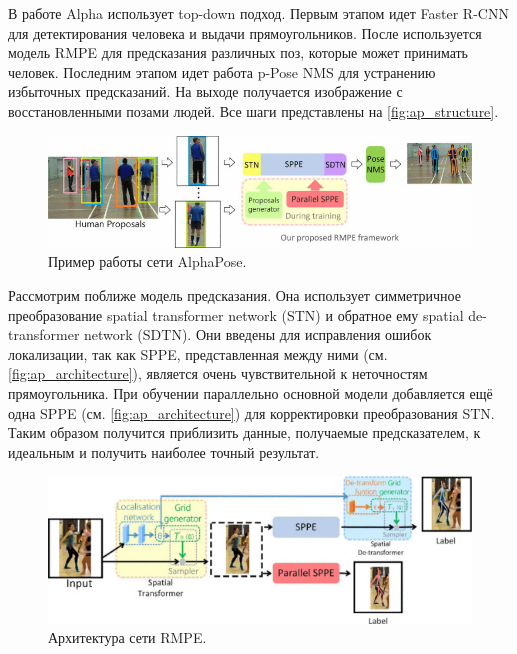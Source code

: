 В работе Alpha использует top-down подход. Первым этапом идет Faster R-CNN для детектирования человека и выдачи прямоугольников. После используется модель RMPE для предсказания различных поз, которые может принимать  человек. Последним этапом идет работа p-Pose NMS для устранению избыточных предсказаний. На выходе получается изображение с восстановленными позами людей. Все шаги представлены на \autoref{fig:ap_structure}. \cite{fang2017rmpe}

\begin{figure}[h]
	\centering
	\includegraphics[width=\textwidth]{./images/AlphaPose_structure}
	\caption{Пример работы сети AlphaPose. \cite{fang2017rmpe}}
	\label{fig:ap_structure}
\end{figure}

Рассмотрим поближе модель предсказания. Она использует симметричное преобразование spatial transformer network (STN) и обратное ему spatial de-transformer network (SDTN). Они введены для исправления ошибок локализации, так как SPPE, представленная между ними (см. \autoref{fig:ap_architecture}), является очень чувствительной к неточностям прямоугольника. При обучении параллельно основной модели добавляется ещё одна SPPE (см. \autoref{fig:ap_architecture}) для корректировки преобразования STN. Таким образом получится приблизить данные, получаемые предсказателем, к идеальным и получить наиболее точный результат.

\begin{figure}[t]
	\centering
	\includegraphics[width=\textwidth]{./images/AlphaPose_architecture}
	\caption{Архитектура сети RMPE. \cite{fang2017rmpe}}
	\label{fig:ap_architecture}
\end{figure}



